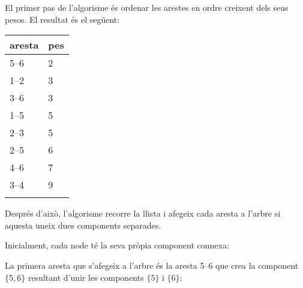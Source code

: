 \begin{samepage}
El primer pas de l’algorisme és ordenar les arestes
en ordre creixent dels seus pesos. El resultat és el següent:

\begin{tabular}{ll}
\\
aresta & pes \\
\hline
5--6 & 2 \\
1--2 & 3 \\
3--6 & 3 \\
1--5 & 5 \\
2--3 & 5 \\
2--5 & 6 \\
4--6 & 7 \\
3--4 & 9 \\
\\
\end{tabular}
\end{samepage}


Després d'això, l'algorisme recorre la llista i afegeix cada aresta a
l'arbre si aquesta uneix dues components separades.

Inicialment, cada node té la seva pròpia component connexa:


\begin{center}
\end{center}
La primera aresta que s'afegeix a l'arbre és la aresta 5--6 que crea
la component $\{5,6\}$ resultant d'unir les components $\{5\}$ i $\{6\}$:


